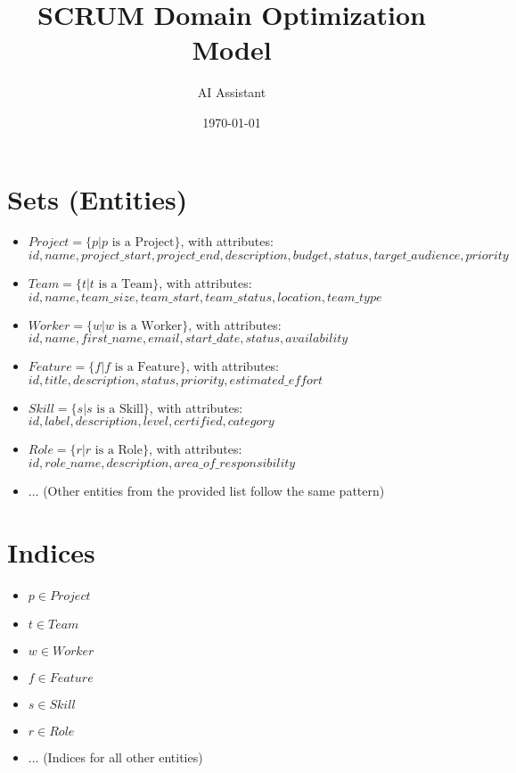 \documentclass{article}
\title{SCRUM Domain Optimization Model}
\author{AI Assistant}
\date{\today}
\begin{document}
\maketitle
\tableofcontents

\section{Sets (Entities)}
\begin{itemize}
    \item $Project = \{p | p \text{ is a Project}\}$, with attributes: $id, name, project\_start, project\_end, description, budget, status, target\_audience, priority$
    \item $Team = \{t | t \text{ is a Team}\}$, with attributes: $id, name, team\_size, team\_start, team\_status, location, team\_type$
    \item $Worker = \{w | w \text{ is a Worker}\}$, with attributes: $id, name, first\_name, email, start\_date, status, availability$
    \item $Feature = \{f | f \text{ is a Feature}\}$, with attributes: $id, title, description, status, priority, estimated\_effort$
    \item $Skill = \{s | s \text{ is a Skill}\}$, with attributes: $id, label, description, level, certified, category$
    \item $Role = \{r | r \text{ is a Role}\}$, with attributes: $id, role\_name, description, area\_of\_responsibility$
    \item $\ldots$ (Other entities from the provided list follow the same pattern)
\end{itemize}

\section{Indices}
\begin{itemize}
    \item $p \in Project$
    \item $t \in Team$
    \item $w \in Worker$
    \item $f \in Feature$
    \item $s \in Skill$
    \item $r \in Role$
    \item $\ldots$ (Indices for all other entities)
\end{itemize}
\end{document}
